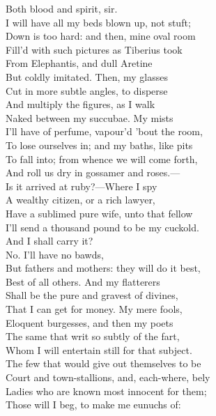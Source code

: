 \documentclass[a4paper,oneside]{memoir}
\begin{document}
\begin{drama*}
\facespeaks {} Both blood and spirit, sir.\\
\mammonspeaks I will have all my beds blown up, not stuft;\\
Down is too hard: and then, mine oval room\\
Fill'd with such pictures as Tiberius took\\
From Elephantis, and dull Aretine\\
But coldly imitated. Then, my glasses\\
Cut in more subtle angles, to disperse\\
And multiply the figures, as I walk\\
Naked between my succubae. My mists\\
I'll have of perfume, vapour'd 'bout the room,\\
To lose ourselves in; and my baths, like pits\\
To fall into; from whence we will come forth,\\
And roll us dry in gossamer and roses.---\\
Is it arrived at ruby?---Where I spy\\
A wealthy citizen, or a rich lawyer,\\
Have a sublimed pure wife, unto that fellow\\
I'll send a thousand pound to be my cuckold.\\
\facespeaks And I shall carry it?\\
\mammonspeaks {} No. I'll have no bawds,\\
But fathers and mothers: they will do it best,\\
Best of all others. And my flatterers\\
Shall be the pure and gravest of divines,\\
That I can get for money. My mere fools,\\
Eloquent burgesses, and then my poets\\
The same that writ so subtly of the fart,\\
Whom I will entertain still for that subject.\\
The few that would give out themselves to be\\
Court and town-stallions, and, each-where, bely\\
Ladies who are known most innocent for them;\\
Those will I beg, to make me eunuchs of:\\

\end{drama*}
\end{document}

